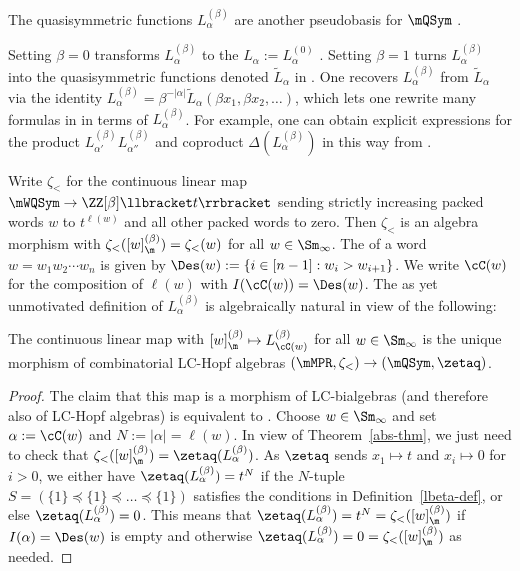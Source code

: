 The  quasisymmetric functions $ L^{(\beta)}_\alpha$ are another pseudobasis for $\mQSym$ \cite[\S3.3]{LM2019}.

\begin{remark}\label{beta-rmk}
Setting $\beta=0$ transforms $L^{(\beta)}_\alpha$ to
the  $L_\alpha := L^{(0)}_\alpha$ \cite[Def.~3.3.4]{LMW}.
Setting $\beta=1$  turns $L^{(\beta)}_\alpha$
into the quasisymmetric functions denoted $\tilde L_\alpha$ in \cite[\S5.3]{LamPyl}.
One recovers $L^{(\beta)}_\alpha$ from $\tilde L_\alpha$ via 
the identity $ L_\alpha^{(\beta)}= \beta^{-|\alpha|}\tilde L_\alpha(\beta x_1,\beta x_2,\dots)$,
which lets one rewrite many formulas in \cite{LamPyl} in terms of $ L_\alpha^{(\beta)}$.
For example, one can obtain explicit expressions
for the product $L^{(\beta)}_{\alpha'} L^{(\beta)}_{\alpha''}$ and coproduct $\Delta(L^{(\beta)}_{\alpha})$
in this way from  \cite[Props. 5.9 and 5.10]{LamPyl}.
\end{remark}

Write $\zeta_{<}$ for the continuous linear map $\mWQSym \to \ZZ[\beta]\llbracket t\rrbracket $
sending strictly increasing packed words $w$ to $t^{\ell(w)}$ and all other packed words to zero.
Then $\zeta_<$ is an algebra morphism with
$\zeta_{<}([w]^{(\beta)}_\m) = \zeta_{<}(w)$ for
all $w \in \Sm_\infty$.
The  of a word $w=w_1w_2\cdots w_n$ is given by $\Des(w) := \{ i \in [n-1] : w_i > w_{i+1}\}$.
We write $\cC(w)$ 
for the composition 
of $\ell(w)$
with $I(\cC(w)) = \Des(w)$.
The as yet unmotivated definition of  $L^{(\beta)}_\alpha$ is algebraically natural in view of the following:

\begin{theorem}%
\label{tl-thm}
The continuous linear map
with $[w]^{(\beta)}_\m \mapsto L^{(\beta)}_{\cC(w)}$ for all $w \in \Sm_\infty$
is
the unique morphism of combinatorial LC-Hopf algebras
$(\mMPR,\zeta_{<}) \to (\mQSym,\zetaq)$.
\end{theorem}

\begin{proof} The claim that this map is a morphism of LC-bialgebras (and therefore also of LC-Hopf algebras) is equivalent to \cite[Thm.~5.11]{LamPyl}.
Choose $w \in \Sm_\infty$ and set $\alpha := \cC(w)$ and $N := |\alpha| = \ell(w)$.
In view of Theorem~\ref{abs-thm}, we just need
to check that $\zeta_{<}([w]^{(\beta)}_\m) = \zetaq(L^{(\beta)}_{\alpha})$.
As $\zetaq$ sends $x_1\mapsto t$ and $x_i\mapsto 0$ for $i>0$,
we either have $\zetaq(L^{(\beta)}_{\alpha}) = t^N$ if the $N$-tuple $S = (\{1\} \preceq \{1\} \preceq \dots \preceq \{1\})$
satisfies the conditions in Definition~\ref{lbeta-def}, or else  $\zetaq(L^{(\beta)}_{\alpha}) =0$.
This means that $\zetaq(L^{(\beta)}_{\alpha}) = t^N = \zeta_{<}([w]^{(\beta)}_\m)$  
if $I(\alpha) = \Des(w)$ is empty and otherwise
$\zetaq(L^{(\beta)}_{\alpha}) = 0 = \zeta_{<}([w]^{(\beta)}_\m)$ as needed.
\end{proof}


